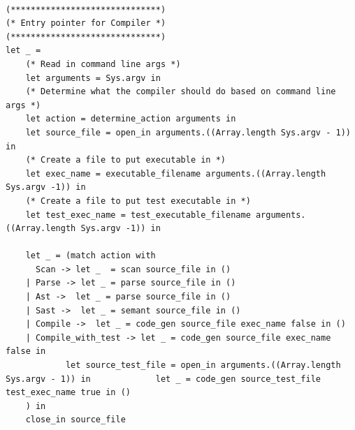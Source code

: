 \documentclass{article}
\begin{document}
\begin{lstlisting}
		 
(******************************)
(* Entry pointer for Compiler *)
(******************************)
let _ =
	(* Read in command line args *)
	let arguments = Sys.argv in
	(* Determine what the compiler should do based on command line args *)
	let action = determine_action arguments in
	let source_file = open_in arguments.((Array.length Sys.argv - 1)) in
	(* Create a file to put executable in *)
	let exec_name = executable_filename arguments.((Array.length Sys.argv -1)) in
	(* Create a file to put test executable in *)
	let test_exec_name = test_executable_filename arguments.((Array.length Sys.argv -1)) in
	
	let _ = (match action with 
	  Scan -> let _  = scan source_file in ()
 	| Parse -> let _ = parse source_file in ()
 	| Ast ->  let _ = parse source_file in ()
 	| Sast ->  let _ = semant source_file in () 
	| Compile ->  let _ = code_gen source_file exec_name false in ()
	| Compile_with_test -> let _ = code_gen source_file exec_name false in 
			let source_test_file = open_in arguments.((Array.length Sys.argv - 1)) in 			  let _ = code_gen source_test_file test_exec_name true in ()
	) in
	close_in source_file
\end{lstlisting}
\end{document}
